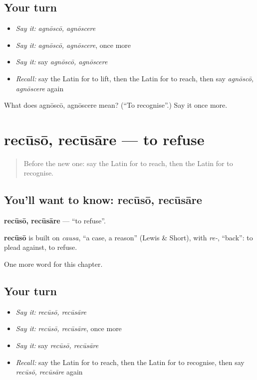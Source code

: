 \subsection*{Your turn}
\begin{itemize}
\raggedright
  \item \emph{Say it:} \emph{agnōscō, agnōscere}
  \item \emph{Say it:} \emph{agnōscō, agnōscere}, once more
  \item \emph{Say it:} say \emph{agnōscō, agnōscere}
  \item \emph{Recall:} say the Latin for to lift, then the Latin for to reach, then say \emph{agnōscō, agnōscere} again
\end{itemize}

\begin{tcolorbox}[breakable,colback=teal!4,colframe=teal!35!black,title={Before you move on}]
What does agnōscō, agnōscere mean? (\textquotedblleft{}To recognise\textquotedblright{}.) Say it once more.
\end{tcolorbox}
\section[recūsō, recūsāre]{recūsō, recūsāre — to refuse}

\label{lesson:LA-C200-recuso}



\begin{quote}
Before the new one: say the Latin for to reach, then the Latin for to recognise.
\end{quote}

\subsection*{You'll want to know: recūsō, recūsāre}
\textbf{recūsō, recūsāre} — \textquotedblleft{}to refuse\textquotedblright{}.

\begin{cousinweb}
\textbf{recūsō} is built on \emph{causa}, \textquotedblleft{}a case, a reason\textquotedblright{} (Lewis \& Short), with \emph{re-}, \textquotedblleft{}back\textquotedblright{}: to plead against, to refuse.
\end{cousinweb}

\begin{grammarlens}[title={What you've built}]
One more word for this chapter.
\end{grammarlens}

\subsection*{Your turn}
\begin{itemize}
\raggedright
  \item \emph{Say it:} \emph{recūsō, recūsāre}
  \item \emph{Say it:} \emph{recūsō, recūsāre}, once more
  \item \emph{Say it:} say \emph{recūsō, recūsāre}
  \item \emph{Recall:} say the Latin for to reach, then the Latin for to recognise, then say \emph{recūsō, recūsāre} again
\end{itemize}

